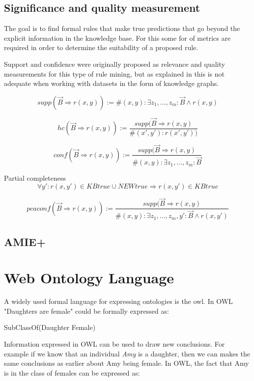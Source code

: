 \subsection{Significance and quality measurement}
The goal is to find formal rules that make true predictions that go beyond the explicit information in the knowledge base. For this some for of metrics are required in order to determine the suitability of a proposed rule.




Support and confidence were originally proposed as relevance and quality measurements for this type of rule mining, but as explained in  this is not adequate when working with datasets in the form of knowledge graphs.

\[supp(\vec{B}\Rightarrow r(x, y)) :=  \# (x, y) : \exists z_1 , ...,z_m : \vec{B} \wedge r(x, y)\]

\[hc(\vec{B}\Rightarrow r(x, y)) := \frac{supp(\vec{B}\Rightarrow r(x, y)}{ \#(x', y'):r(x', y'))}\]

\[conf(\vec{B}\Rightarrow r(x, y)) := \frac{supp(\vec{B}\Rightarrow r(x, y)}{\#(x, y):\exists z_1 ,..., z_m : \vec{B}}\]

Partial completeness
\[\forall y' : r(x, y') \in KBtrue \cup NEWtrue \Rightarrow r(x, y') \in KBtrue\]

\[pcaconf(\vec{B}\Rightarrow r(x, y)) := \frac{supp(\vec{B}\Rightarrow r(x, y)}{\#(x, y):\exists z_1 ,..., z_m, y' : \vec{B} \wedge r(x, y')}\]


\subsection{AMIE+}

\iffalse 
\section{Web Ontology Language}
A widely used formal language for expressing ontologies is the \gls{owl}. In OWL "Daughters are female" could be formally expressed as:

\centerline{\textsf{SubClassOf(Daughter Female)}}
Information expressed in OWL can be used to draw new conclusions. For example if we know that an individual \emph{Amy} is a daughter, then we can makes the same conclusions as earlier about Amy being female. In OWL, the fact that Amy is in the class of females can be expressed as:

